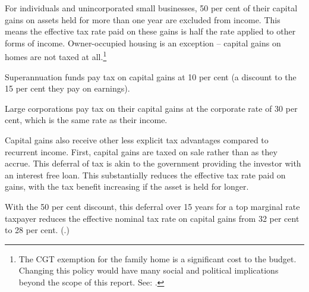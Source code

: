 For individuals and unincorporated small businesses, 50 per cent of their capital gains on assets held for more than one year are excluded from income. This means the effective tax rate paid on these gains is half the rate applied to other forms of income. Owner-occupied housing is an exception – capital gains on homes are not taxed at all.\footnote{The CGT exemption for the family home is a significant cost to the budget. Changing this policy would have many social and political implications beyond the scope of this report. See: \textcite[][43--45]{DaleyMcGannonSavageEtAl2013BalancingBudgets}.}

Superannuation funds pay tax on capital gains at 10 per cent (a discount to the 15 per cent they pay on earnings). 

Large corporations pay tax on their capital gains at the corporate rate of 30 per cent, which is the same rate as their income.

Capital gains also receive other less explicit tax advantages compared to recurrent income. First, capital gains are taxed on sale rather than as they accrue. This deferral of tax is akin to the government providing the investor with an interest free loan.  This substantially reduces the effective tax rate paid on gains, with the tax benefit increasing if the asset is held for longer.


With the 50 per cent discount, this deferral over 15 years for a top marginal rate taxpayer reduces the effective nominal tax rate on capital gains from 32 per cent to 28 per cent. (.)

